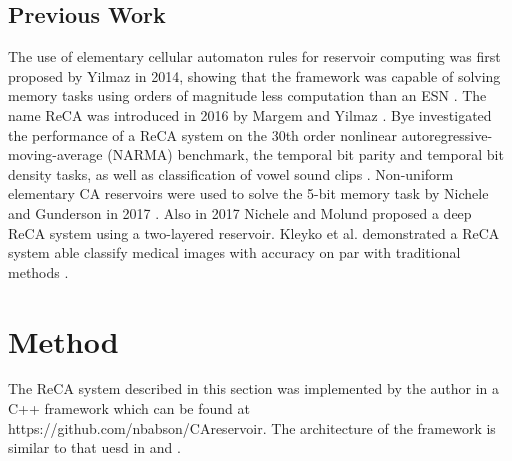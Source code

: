\documentclass{elsarticle}
\begin{document}
\begin{multicols}{2}
\subsection{Previous Work}

The use of elementary cellular automaton rules for reservoir computing was 
   first proposed by Yilmaz in 2014, showing that the framework was capable of 
   solving memory tasks using orders of magnitude less computation than an ESN 
   \cite{yilmaz2014reservoir}. The name ReCA was introduced in 2016 by Margem 
   and Yilmaz \cite{margem2017experimental}. Bye investigated the performance 
   of a ReCA system on the 30th order nonlinear autoregressive-moving-average 
   (NARMA) benchmark, the temporal bit parity and temporal bit density tasks, 
   as well as classification of vowel sound clips \cite{bye2016investigation}.  
      Non-uniform elementary CA reservoirs were used to solve the 5-bit memory 
      task by Nichele and Gunderson in 2017 \cite{nichele2017reservoir}. Also 
      in 2017 Nichele and Molund proposed a deep ReCA system using a 
      two-layered reservoir. Kleyko et al. demonstrated a ReCA system able 
      classify medical images with accuracy on par with traditional methods 
      \cite{kleyko2017modality}.
 





\section{Method}\label{method}
The ReCA system described in this section was implemented by the author in a 
C++ framework which can be found at https://github.com/nbabson/CAreservoir. The 
architecture of the framework is similar to that uesd in  
\cite{nichele2017deep} and \cite{bye2016investigation}.


\end{multicols}
\end{document}
